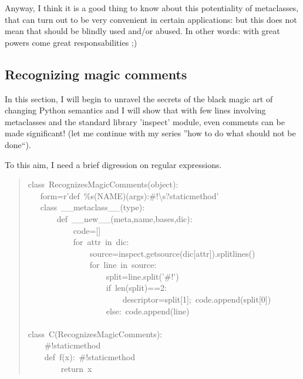 \documentclass[10pt,english]{article}
\begin{document}
Anyway, I think it is a good thing to know about this potentiality
of metaclasses, that can turn out to be very convenient in certain
applications: but this does not mean that should be blindly used
and/or abused. In other words: with great powers come 
great responsabilities ;)



\hypertarget{recognizing-magic-comments}{}
\subsection*{Recognizing magic comments}

In this section, I will begin to unravel the secrets of the black magic art 
of changing Python semantics and I will show that with few lines 
involving metaclasses
and the standard library 'inspect' module, even comments can be made
significant! (let me continue with my series ''how to do what should not
be done``).

To this aim, I need a brief digression on regular expressions.
\begin{quote}
\begin{ttfamily}\begin{flushleft}
\mbox{class~RecognizesMagicComments(object):}\\
\mbox{~~~form=r'def~{\%}s(NAME)(args):{\#}!{\textbackslash}s?staticmethod'}\\
\mbox{~~~class~{\_}{\_}metaclass{\_}{\_}(type):}\\
\mbox{~~~~~~~def~{\_}{\_}new{\_}{\_}(meta,name,bases,dic):}\\
\mbox{~~~~~~~~~~~code=[]}\\
\mbox{~~~~~~~~~~~for~attr~in~dic:}\\
\mbox{~~~~~~~~~~~~~~~source=inspect.getsource(dic[attr]).splitlines()}\\
\mbox{~~~~~~~~~~~~~~~for~line~in~source:}\\
\mbox{~~~~~~~~~~~~~~~~~~~split=line.split('{\#}!')}\\
\mbox{~~~~~~~~~~~~~~~~~~~if~len(split)==2:}\\
\mbox{~~~~~~~~~~~~~~~~~~~~~~~descriptor=split[1];~code.append(split[0])}\\
\mbox{~~~~~~~~~~~~~~~~~~~else:~code.append(line)}\\
\mbox{~~~~~~~~~~~~~}\\
\mbox{class~C(RecognizesMagicComments):}\\
\mbox{~~~~{\#}!staticmethod}\\
\mbox{~~~~def~f(x):~{\#}!staticmethod}\\
\mbox{~~~~~~~~return~x}
\end{flushleft}\end{ttfamily}
\end{quote}
\end{document}
